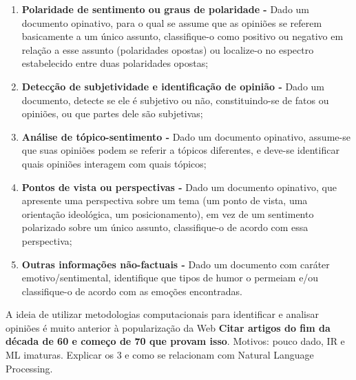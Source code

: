\begin{enumerate}
    \item \textbf{Polaridade de sentimento ou graus de polaridade -} Dado um documento opinativo, para o qual se assume que as opiniões se referem basicamente a um único assunto, classifique-o como positivo ou negativo em relação a esse assunto (polaridades opostas) ou localize-o no espectro estabelecido entre duas polaridades opostas;
    \item \textbf{Detecção de subjetividade e identificação de opinião -} Dado um documento, detecte se ele é subjetivo ou não, constituindo-se de fatos ou opiniões, ou que partes dele são subjetivas;
    \item \textbf{Análise de tópico-sentimento -} Dado um documento opinativo, assume-se que suas opiniões podem se referir a tópicos diferentes, e deve-se identificar quais opiniões interagem com quais tópicos;
   \item \textbf{Pontos de vista ou perspectivas -} Dado um documento opinativo, que apresente uma perspectiva sobre um tema (um ponto de vista, uma orientação ideológica, um posicionamento), em vez de um sentimento polarizado sobre um único assunto, classifique-o de acordo com essa perspectiva;
   \item \textbf{Outras informações não-factuais -} Dado um documento com caráter emotivo/sentimental, identifique que tipos de humor o permeiam e/ou classifique-o de acordo com as emoções encontradas.

\end{enumerate}




A ideia de utilizar metodologias computacionais para identificar e analisar opiniões é muito anterior à popularização da Web \textbf{Citar artigos do fim da década de 60 e começo de 70 que provam isso}. Motivos: pouco dado, IR e ML imaturas. Explicar os 3 e como se relacionam com Natural Language Processing.

